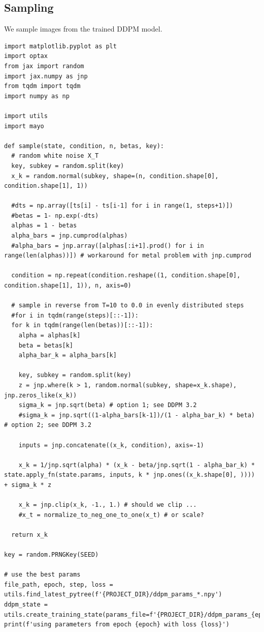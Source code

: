 \documentclass[a4paper, 11pt]{article}
\begin{document}
\subsection{Sampling}
\label{sec:org42d1236}
We sample images from the trained DDPM model.
\begin{verbatim}
import matplotlib.pyplot as plt
import optax
from jax import random
import jax.numpy as jnp
from tqdm import tqdm
import numpy as np

import utils
import mayo

def sample(state, condition, n, betas, key):
  # random white noise X_T
  key, subkey = random.split(key)
  x_k = random.normal(subkey, shape=(n, condition.shape[0], condition.shape[1], 1))

  #dts = np.array([ts[i] - ts[i-1] for i in range(1, steps+1)])
  #betas = 1- np.exp(-dts)
  alphas = 1 - betas
  alpha_bars = jnp.cumprod(alphas)
  #alpha_bars = jnp.array([alphas[:i+1].prod() for i in range(len(alphas))]) # workaround for metal problem with jnp.cumprod

  condition = np.repeat(condition.reshape((1, condition.shape[0], condition.shape[1], 1)), n, axis=0)

  # sample in reverse from T=10 to 0.0 in evenly distributed steps
  #for i in tqdm(range(steps)[::-1]):
  for k in tqdm(range(len(betas))[::-1]):
    alpha = alphas[k]
    beta = betas[k]
    alpha_bar_k = alpha_bars[k]

    key, subkey = random.split(key)
    z = jnp.where(k > 1, random.normal(subkey, shape=x_k.shape), jnp.zeros_like(x_k))
    sigma_k = jnp.sqrt(beta) # option 1; see DDPM 3.2
    #sigma_k = jnp.sqrt((1-alpha_bars[k-1])/(1 - alpha_bar_k) * beta) # option 2; see DDPM 3.2

    inputs = jnp.concatenate((x_k, condition), axis=-1)

    x_k = 1/jnp.sqrt(alpha) * (x_k - beta/jnp.sqrt(1 - alpha_bar_k) * state.apply_fn(state.params, inputs, k * jnp.ones((x_k.shape[0], )))) + sigma_k * z

    x_k = jnp.clip(x_k, -1., 1.) # should we clip ...
    #x_t = normalize_to_neg_one_to_one(x_t) # or scale?

  return x_k

key = random.PRNGKey(SEED)

# use the best params
file_path, epoch, step, loss = utils.find_latest_pytree(f'{PROJECT_DIR}/ddpm_params_*.npy')
ddpm_state = utils.create_training_state(params_file=f'{PROJECT_DIR}/ddpm_params_{epoch}_{step}_{loss}.npy')
print(f'using parameters from epoch {epoch} with loss {loss}')


\end{verbatim}
\end{document}
